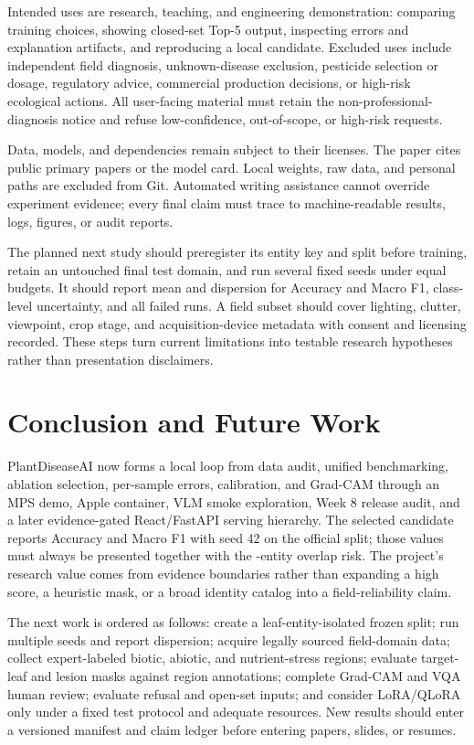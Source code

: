 \documentclass[11pt]{article}
\begin{document}
Intended uses are research, teaching, and engineering demonstration: comparing training choices, showing closed-set Top-5 output, inspecting errors and explanation artifacts, and reproducing a local candidate. Excluded uses include independent field diagnosis, unknown-disease exclusion, pesticide selection or dosage, regulatory advice, commercial production decisions, or high-risk ecological actions. All user-facing material must retain the non-professional-diagnosis notice and refuse low-confidence, out-of-scope, or high-risk requests.

Data, models, and dependencies remain subject to their licenses. The paper cites public primary papers or the model card. Local weights, raw data, and personal paths are excluded from Git. Automated writing assistance cannot override experiment evidence; every final claim must trace to machine-readable results, logs, figures, or audit reports.

The planned next study should preregister its entity key and split before training, retain an untouched final test domain, and run several fixed seeds under equal budgets. It should report mean and dispersion for Accuracy and Macro F1, class-level uncertainty, and all failed runs. A field subset should cover lighting, clutter, viewpoint, crop stage, and acquisition-device metadata with consent and licensing recorded. These steps turn current limitations into testable research hypotheses rather than presentation disclaimers.

\section{Conclusion and Future Work}

PlantDiseaseAI now forms a local loop from data audit, unified benchmarking, ablation selection, per-sample errors, calibration, and Grad-CAM through an MPS demo, Apple container, VLM smoke exploration, Week 8 release audit, and a later evidence-gated React/FastAPI serving hierarchy. The selected candidate reports Accuracy \PDAFinalAccuracy{} and Macro F1 \PDAFinalMacroFOne{} with seed 42 on the official split; those values must always be presented together with the \PDAOfficialOverlap{}-entity overlap risk. The project's research value comes from evidence boundaries rather than expanding a high score, a heuristic mask, or a broad identity catalog into a field-reliability claim.

The next work is ordered as follows: create a leaf-entity-isolated frozen split; run multiple seeds and report dispersion; acquire legally sourced field-domain data; collect expert-labeled biotic, abiotic, and nutrient-stress regions; evaluate target-leaf and lesion masks against region annotations; complete Grad-CAM and VQA human review; evaluate refusal and open-set inputs; and consider LoRA/QLoRA only under a fixed test protocol and adequate resources. New results should enter a versioned manifest and claim ledger before entering papers, slides, or resumes.
\end{document}
